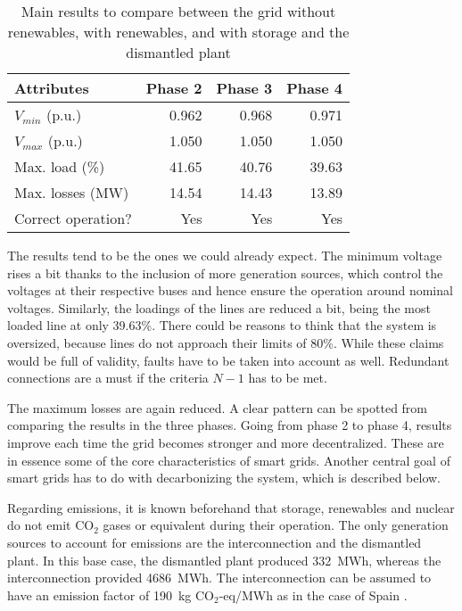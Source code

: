 \begin{table}[!htb]\centering
  \begin{tabular}{lrrr}
    \hline
    \textbf{Attributes} & \textbf{Phase 2} & \textbf{Phase 3} & \textbf{Phase 4}\\
    \hline
    $V_{min}$ (p.u.) & 0.962 & 0.968 & 0.971 \\
    $V_{max}$ (p.u.) & 1.050 & 1.050 & 1.050 \\
    Max. load (\%) & 41.65 & 40.76 & 39.63 \\
    Max. losses (MW) & 14.54 & 14.43 & 13.89 \\
    Correct operation? & Yes & Yes & Yes \\
    \hline
  \end{tabular}
  \caption{Main results to compare between the grid without renewables, with renewables, and with storage and the dismantled plant}
  \label{tab:compare2}
\end{table}
The results tend to be the ones we could already expect. The minimum voltage rises a bit thanks to the inclusion of more generation sources, which control the voltages at their respective buses and hence ensure the operation around nominal voltages. Similarly, the loadings of the lines are reduced a bit, being the most loaded line at only 39.63\%. There could be reasons to think that the system is oversized, because lines do not approach their limits of 80\%. While these claims would be full of validity, faults have to be taken into account as well. Redundant connections are a must if the criteria $N-1$ has to be met. 

The maximum losses are again reduced. A clear pattern can be spotted from comparing the results in the three phases. Going from phase 2 to phase 4, results improve each time the grid becomes stronger and more decentralized. These are in essence some of the core characteristics of smart grids. Another central goal of smart grids has to do with decarbonizing the system, which is described below. 

Regarding emissions, it is known beforehand that storage, renewables and nuclear do not emit CO$_2$ gases or equivalent during their operation. The only generation sources to account for emissions are the interconnection and the dismantled plant. In this base case, the dismantled plant produced 332~MWh, whereas the interconnection provided 4686~MWh. The interconnection can be assumed to have an emission factor of 190~kg CO$_2$-eq/MWh as in the case of Spain \cite{ree_co2, spork2015increasing}.

